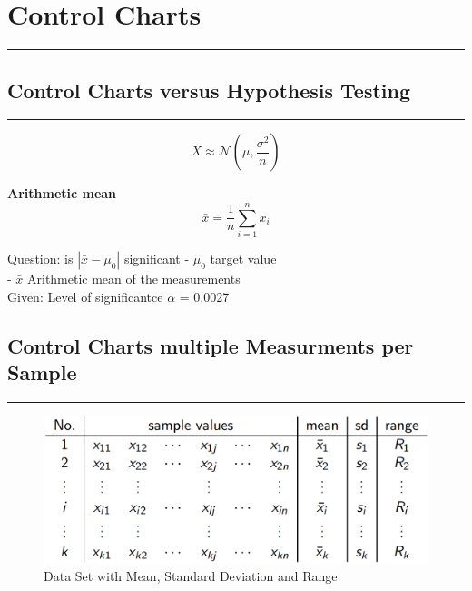 \section{Control Charts}
\noindent\rule[\linienAbstand]{\linewidth}{\linienDickeDick}

\subsection{Control Charts versus Hypothesis Testing}
\noindent\rule[\linienAbstand]{\linewidth}{\linienDicke}
\begin{equation}
  \bar{X} \approx \mathcal{N}\left(\mu, \frac{\sigma^{2}}{n}\right)
\end{equation}



\textbf{Arithmetic mean}
\begin{equation}
  \bar{x} = \frac{1}{n} \sum_{i=1}^n x_i
\end{equation}

Question: is $\left|\bar{x} - \mu_0\right|$ significant
- $\mu_0$ target value\\
- $\bar{x}$ Arithmetic mean of the measurements\\
Given: Level of significantce $\alpha$ = 0.0027

\subsection{Control Charts multiple Measurments per Sample}
\noindent\rule[\linienAbstand]{\linewidth}{\linienDicke}
\begin{figure}
  \includegraphics{Pics/2.1.png}
  \caption{Data Set with Mean, Standard Deviation and Range}
  \label{2.1}
\end{figure}

